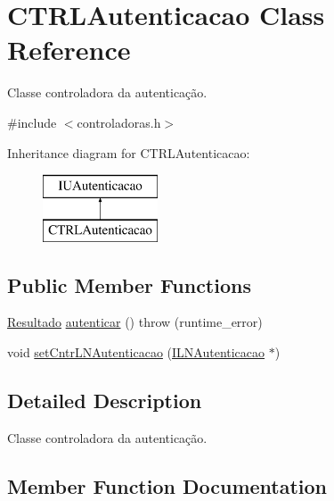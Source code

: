 \hypertarget{classCTRLAutenticacao}{}\section{C\+T\+R\+L\+Autenticacao Class Reference}
\label{classCTRLAutenticacao}


Classe controladora da autenticação.  




{\ttfamily \#include $<$controladoras.\+h$>$}

Inheritance diagram for C\+T\+R\+L\+Autenticacao\+:\begin{figure}[H]
\begin{center}
\leavevmode
\includegraphics[height=2.000000cm]{classCTRLAutenticacao}
\end{center}
\end{figure}
\subsection*{Public Member Functions}
\begin{DoxyCompactItemize}
\item 
\hyperlink{classResultado}{Resultado} \hyperlink{classCTRLAutenticacao_a9758636458f90f8054637e70a94f1825}{autenticar} ()  throw (runtime\+\_\+error)
\item 
void \hyperlink{classCTRLAutenticacao_aa81983ebd30b5ec21e49670034ebd2b9}{set\+Cntr\+L\+N\+Autenticacao} (\hyperlink{classILNAutenticacao}{I\+L\+N\+Autenticacao} $\ast$)
\end{DoxyCompactItemize}


\subsection{Detailed Description}
Classe controladora da autenticação. 

\subsection{Member Function Documentation}
\mbox{\label{classCTRLAutenticacao_a9758636458f90f8054637e70a94f1825}} 
